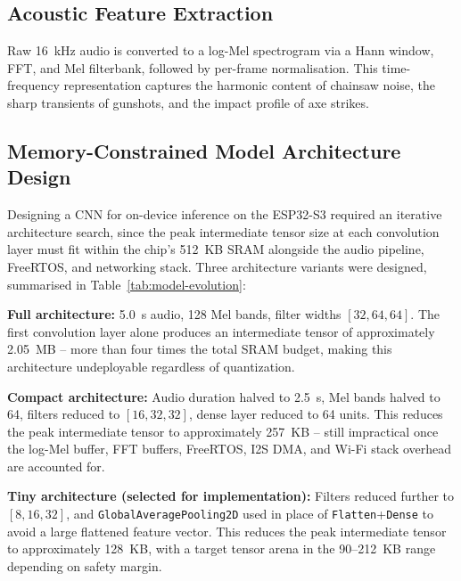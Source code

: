 \subsection{Acoustic Feature Extraction}

Raw 16~kHz audio is converted to a log-Mel spectrogram via a Hann window,
FFT, and Mel filterbank, followed by per-frame normalisation. This
time-frequency representation captures the harmonic content of chainsaw
noise, the sharp transients of gunshots, and the impact profile of axe
strikes.

\subsection{Memory-Constrained Model Architecture Design}
\label{subsec:model-evolution}

Designing a CNN for on-device inference on the ESP32-S3 required an
iterative architecture search, since the peak intermediate tensor size at
each convolution layer must fit within the chip's 512~KB SRAM alongside the
audio pipeline, FreeRTOS, and networking stack. Three architecture variants
were designed, summarised in Table~\ref{tab:model-evolution}:

\textbf{Full architecture:} 5.0~s audio, 128 Mel bands, filter widths
$[32,64,64]$. The first convolution layer alone produces an intermediate
tensor of approximately 2.05~MB -- more than four times the total SRAM
budget, making this architecture undeployable regardless of quantization.

\textbf{Compact architecture:} Audio duration halved to 2.5~s, Mel bands
halved to 64, filters reduced to $[16,32,32]$, dense layer reduced to 64
units. This reduces the peak intermediate tensor to approximately 257~KB --
still impractical once the log-Mel buffer, FFT buffers, FreeRTOS, I2S DMA,
and Wi-Fi stack overhead are accounted for.

\textbf{Tiny architecture (selected for implementation):} Filters reduced
further to $[8,16,32]$, and \texttt{GlobalAveragePooling2D} used in place of
\texttt{Flatten}+\texttt{Dense} to avoid a large flattened feature vector.
This reduces the peak intermediate tensor to approximately 128~KB, with a
target tensor arena in the 90--212~KB range depending on safety margin.

